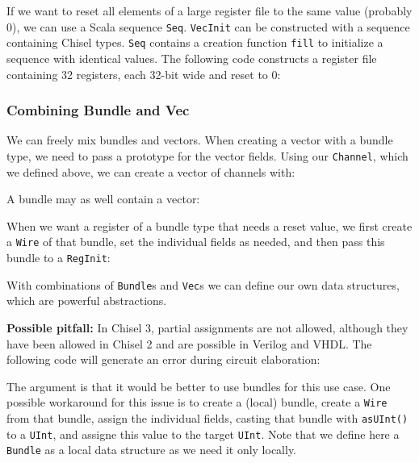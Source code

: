 \documentclass[%
    10pt,
    headinclude, footexclude,
    openright, %
    notitlepage,
    cleardoubleempty,
    headsepline,
    pointlessnumbers,
    bibtotoc, idxtotoc,
    ]{scrbook}
\newcommand{\code}[1]{{\small{\texttt{#1}}}}
\begin{document}

If we want to reset all elements of a large register file to the same value (probably 0), we
can use a Scala sequence \code{Seq}. \code{VecInit} can be constructed with a sequence
containing Chisel types. \code{Seq} contains a creation function \code{fill} to initialize a sequence
with identical values.
The following code constructs a register file containing 32 registers, each 32-bit wide and reset to
0:


\subsubsection{Combining Bundle and Vec}

We can freely mix bundles and vectors. When creating a vector with a bundle
type, we need to pass a prototype for the vector fields. Using our
\code{Channel}, which we defined above, we can create a vector of channels with:


\noindent A bundle may as well contain a vector:


When we want a register of a bundle type that needs a reset value,
we first create a \code{Wire} of that bundle, set the individual fields
as needed, and then pass this bundle to a \code{RegInit}:


With combinations of \code{Bundle}s and \code{Vec}s we can define our own data
structures, which are powerful abstractions.

{\bf Possible pitfall:} In Chisel 3, partial assignments are not allowed, although they have been
allowed in Chisel 2 and are possible in Verilog and VHDL. The following code will generate
an error during circuit elaboration:


\noindent The argument is that it would be better to use bundles for this use case.
One possible workaround for this issue is to create a (local) bundle, create a \code{Wire}
from that bundle, assign the individual fields, casting that bundle with \code{asUInt()}
to a \code{UInt}, and assigne this value to the target \code{UInt}.
Note that we define here a \code{Bundle} as a local data structure as we need it only
locally.
\end{document}
